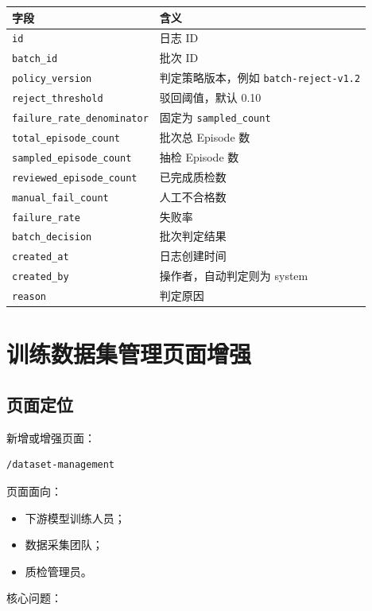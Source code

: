 \documentclass[UTF8,12pt,a4paper]{ctexart}
\begin{document}
\begin{longtable}{p{4.5cm}p{10cm}}
\toprule
字段 & 含义 \\
\midrule
\texttt{id} & 日志 ID \\
\texttt{batch\_id} & 批次 ID \\
\texttt{policy\_version} & 判定策略版本，例如 \texttt{batch-reject-v1.2} \\
\texttt{reject\_threshold} & 驳回阈值，默认 0.10 \\
\texttt{failure\_rate\_denominator} & 固定为 \texttt{sampled\_count} \\
\texttt{total\_episode\_count} & 批次总 Episode 数 \\
\texttt{sampled\_episode\_count} & 抽检 Episode 数 \\
\texttt{reviewed\_episode\_count} & 已完成质检数 \\
\texttt{manual\_fail\_count} & 人工不合格数 \\
\texttt{failure\_rate} & 失败率 \\
\texttt{batch\_decision} & 批次判定结果 \\
\texttt{created\_at} & 日志创建时间 \\
\texttt{created\_by} & 操作者，自动判定则为 system \\
\texttt{reason} & 判定原因 \\
\bottomrule
\end{longtable}

\section{训练数据集管理页面增强}

\subsection{页面定位}

新增或增强页面：

\begin{lstlisting}
/dataset-management
\end{lstlisting}

页面面向：

\begin{itemize}
  \item 下游模型训练人员；
  \item 数据采集团队；
  \item 质检管理员。
\end{itemize}

核心问题：
\end{document}
